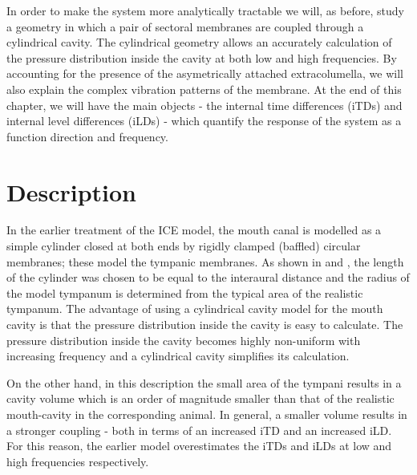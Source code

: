 In order to make the system more analytically tractable we will, as before, study a geometry in which a pair of sectoral
membranes are coupled through a cylindrical cavity. The cylindrical geometry allows an accurately calculation of the 
pressure distribution inside the cavity at both low and high frequencies. By accounting for the presence of the asymetrically attached
extracolumella, we will also explain the complex vibration patterns of the membrane. At the end of this chapter, we will
have the main objects - the internal time differences (iTDs) and internal level differences (iLDs) - which 
quantify the response of the system as a function direction and frequency.

\section{Description}\label{description}
In the earlier treatment of the ICE model, the mouth canal is modelled as a simple cylinder closed at 
both ends by rigidly clamped (baffled) circular membranes; these model the tympanic membranes. As shown 
in \cite{vossenthesis} and \cite{vossenjasa}, the length of the cylinder was chosen to be equal to the interaural distance and the radius of the model tympanum is
determined from the typical area of the realistic tympanum. The advantage of using a cylindrical cavity model for the mouth cavity is that the pressure
distribution inside the cavity is easy to calculate. The pressure distribution inside the cavity becomes highly non-uniform 
with increasing frequency and a cylindrical cavity simplifies its calculation. 

On the other hand, in this description the small area of the tympani results in a cavity volume which 
is an order of magnitude smaller than that of the realistic mouth-cavity in the corresponding animal. In general, a smaller volume results in a stronger coupling - both in terms of an increased iTD and an increased
iLD. For this reason, the earlier model overestimates the iTDs and iLDs at
low and high frequencies respectively.

